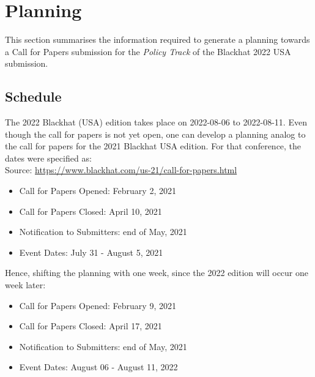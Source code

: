 \section{Planning}
\label{sec:planning}
This section summarises the information required to generate a planning towards a Call for Papers submission for the \textit{Policy Track} of the Blackhat 2022 USA submission.


\subsection{Schedule}
The 2022 Blackhat (USA) edition takes place on 2022-08-06 to 2022-08-11. Even though the call for papers is not yet open, one can develop a planning analog to the call for papers for the 2021 Blackhat USA edition. For that conference, the dates were specified as:\\
Source: \url{https://www.blackhat.com/us-21/call-for-papers.html}
\begin{itemize}
	\item Call for Papers Opened: February 2, 2021
	\item Call for Papers Closed: April 10, 2021
	\item Notification to Submitters: end of May, 2021
	\item Event Dates: July 31 - August 5, 2021
\end{itemize}
Hence, shifting the planning with one week, since the 2022 edition will occur one week later:
\begin{itemize}
	\item Call for Papers Opened: February 9, 2021
	\item Call for Papers Closed: April 17, 2021
	\item Notification to Submitters: end of May, 2021
	\item Event Dates: August 06 - August 11, 2022
\end{itemize}

